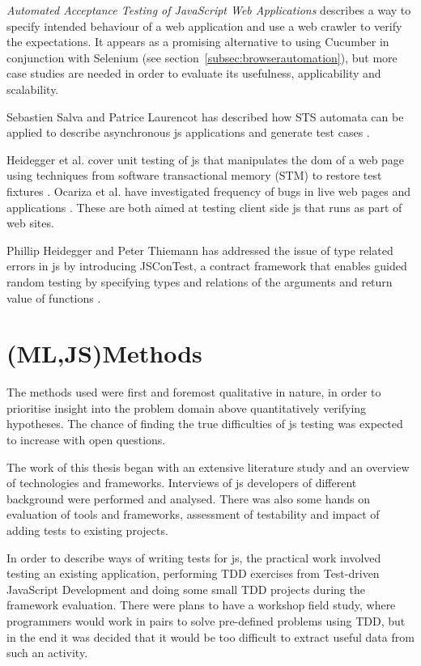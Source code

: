 \documentclass[11pt]{article}
\begin{document}
\emph{Automated Acceptance Testing of JavaScript Web Applications} \cite{AutomatedAcceptance} describes a way to specify intended behaviour of a web application and use a web crawler to verify the expectations. It appears as a promising alternative to using Cucumber in conjunction with Selenium (see section~\ref{subsec:browserautomation}), but more case studies are needed in order to evaluate its usefulness, applicability and scalability. %

Sebastien Salva and Patrice Laurencot has described how STS automata can be applied to describe asynchronous \gls{js} applications and generate test cases \cite{AutomatedAjax}.

Heidegger et al. cover unit testing of \gls{js} that manipulates the \gls{dom} of a web page using techniques from software transactional memory (STM) to restore test fixtures \cite{DOMJavascript}. Ocariza et al. have investigated frequency of bugs in live web pages and applications \cite{Wild}. These are both aimed at testing client side \gls{js} that runs as part of web sites.

Phillip Heidegger and Peter Thiemann has addressed the issue of type related errors in \gls{js} by introducing JSConTest, a contract framework that enables guided random testing by specifying types and relations of the arguments and return value of functions \cite{ContractTesting}.


\section{(ML,JS)Methods}

The methods used were first and foremost qualitative in nature, in order to prioritise insight into the problem domain above quantitatively verifying hypotheses. The chance of finding the true difficulties of \gls{js} testing was expected to increase with open questions.

The work of this thesis began with an extensive literature study and an overview of technologies and frameworks. Interviews of \gls{js} developers of different background were performed and analysed. There was also some hands on evaluation of tools and frameworks, assessment of testability and impact of adding tests to existing projects.

In order to describe ways of writing tests for \gls{js}, the practical work involved testing an existing application, performing TDD exercises from Test-driven JavaScript Development \cite{Tddjs} and doing some small TDD projects during the framework evaluation. There were plans to have a workshop field study, where programmers would work in pairs to solve pre-defined problems using TDD, but in the end it was decided that it would be too difficult to extract useful data from such an activity.
\end{document}
